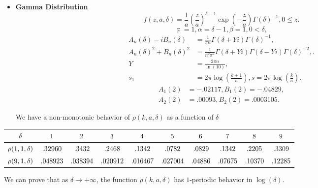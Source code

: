 \documentclass[titlepage,fleqn]{article}%
\begin{document}
\begin{itemize}
\item \textbf{Gamma Distribution}%
\[
f(z,a,\delta)=\frac{1}{a}\left(  \frac{z}{a}\right)  ^{\delta-1}\exp\left(
-\frac{z}{a}\right)  \Gamma\left(  \delta\right)  ^{-1},0\leq z.
\]%
\[
\digamma=1,\alpha=\delta-1,\beta=1,0<\delta,
\]%
\begin{align}
A_{n}(\delta)-iB_{n}(\delta)  &  =\frac{1}{\pi n}\Gamma\left(  \delta
+Yi\right)  \Gamma\left(  \delta\right)  ^{-1},\\
A_{n}(\delta)^{2}+B_{n}(\delta)^{2}  &  =\frac{1}{n^{2}\pi^{2}}\Gamma\left(
\delta+Yi\right)  \Gamma\left(  \delta-Yi\right)  \Gamma\left(  \delta\right)
^{-2},.\\
Y  &  =\frac{2\pi n}{\ln(10)},\\
s_{1}  &  =2\pi\log\left(  \frac{k+1}{a}\right)  ,s=2\pi\log\left(  \frac
{k}{a}\right)  .
\end{align}%
\begin{align}
A_{1}(2)  &  =-.02117,B_{1}(2)=-.04829,\\
A_{2}(2)  &  =.00093,B_{2}(2)=.0003105.
\end{align}


We have a non-monotonic behavior of $\rho(k,a,\delta)$ as a function of
$\delta$
\end{itemize}

%

\begin{tabular}
[c]{|c|c|c|c|c|c|c|c|c|c|}\hline\hline
$\delta$ & ${\small 1}$ & ${\small 2}$ & ${\small 3}$ & ${\small 4}$ &
${\small 5}$ & ${\small 6}$ & ${\small 7}$ & ${\small 8}$ & ${\small 9}%
$\\\hline
${\small \rho(1,1,\delta)}$ & ${\small .32960}$ & ${\small .3432}$ &
${\small .2468}$ & ${\small .1342}$ & ${\small .0782}$ & ${\small .0829}$ &
${\small .1342}$ & ${\small .2205}$ & {\small .}$3309$\\\hline
${\small \rho(9,1,\delta)}$ & ${\small .048923}$ & ${\small .038394}$ &
${\small .020912}$ & ${\small .016467}$ & ${\small .027004}$ &
${\small .04886}$ & ${\small .07675}$ & ${\small .10370}$ & ${\small .12285}%
$\\\hline\hline
\end{tabular}


\bigskip

We can prove that as $\delta\rightarrow+\infty$, the function $\rho
(k,a,\delta)$ has $1$-periodic behavior in $\log(\delta).$%
\end{document}
